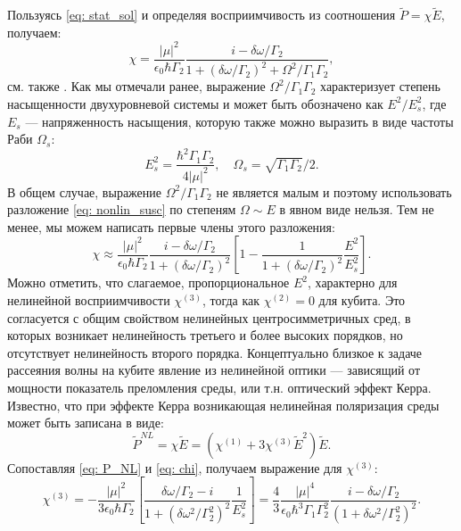 Пользуясь \eqref{eq: stat_sol} и определяя восприимчивость из соотношения $\tilde{P} = \chi\tilde{E}$, получаем:
\begin{equation}
\chi = \frac{|\mu|^2}{\epsilon_0\hbar\Gamma_2}\frac{i-\delta\omega/\Gamma_2}{1+(\delta\omega/\Gamma_2)^2 + \Omega^2/\Gamma_1\Gamma_2},
\end{equation}
см. также \cite{boyd2003nonlinear}. Как мы отмечали ранее, выражение $\Omega^2/\Gamma_1\Gamma_2$ характеризует степень насыщенности двухуровневой системы и может быть обозначено как ${E^2}/{E^2_s}$, где $E_s$ --- напряженность насыщения, которую также можно выразить в виде частоты Раби $\Omega_s$: 
\begin{equation}
E_s^2 = \frac{\hbar^2\Gamma_1\Gamma_2}{4|\mu|^2}, \quad \Omega_s = \sqrt{\Gamma_1\Gamma_2}/2.
\label{eq: E_s}
\end{equation}
В общем случае, выражение $\Omega^2/\Gamma_1\Gamma_2$ не является малым и поэтому использовать разложение \eqref{eq: nonlin_susc} по степеням $\Omega \sim E$ в явном виде нельзя. Тем не менее, мы можем написать первые члены этого разложения:  
\begin{equation}
\chi\approx\frac{|\mu|^2}{\epsilon_0\hbar\Gamma_2}\frac{i-\delta\omega/\Gamma_2}{1+(\delta\omega/\Gamma_2)^2}\left[1-\frac{1}{1+(\delta\omega/\Gamma_2)^2}\frac{E^2}{E^2_s}\right].
\label{eq: chi}
\end{equation}
Можно отметить, что слагаемое, пропорциональное $E^2$, характерно для нелинейной восприимчивости $\chi^{(3)}$, тогда как $\chi^{(2)}=0$ для кубита. Это согласуется с общим свойством нелинейных центросимметричных сред, в которых возникает нелинейность третьего и более высоких порядков, но отсутствует нелинейность второго порядка. 
Концептуально близкое к задаче рассеяния волны на кубите явление из нелинейной оптики --- зависящий от мощности показатель преломления среды, или т.н. оптический эффект Керра. Известно, что при эффекте Керра возникающая нелинейная поляризация среды может быть записана в виде:
\begin{equation}
\tilde{P}^{N\!L} = \chi \tilde{E} = \left(\chi^{(1)} + 3\chi^{(3)}\tilde{E}^2\right)\tilde{E}.
\label{eq: P_NL}
\end{equation}
Сопоставляя \eqref{eq: P_NL} и \eqref{eq: chi}, получаем выражение для $\chi^{(3)}$:
\begin{equation}
\chi^{(3)} = -\frac{|\mu|^2}{3\epsilon_0\hbar\Gamma_2}\left[\frac{\delta\omega/\Gamma_2-i}{1+(\delta\omega^2/\Gamma^2_2)^2}\frac{1}{E^2_s}\right] = \frac{4}{3}\frac{|\mu|^4}{\epsilon_0\hbar^3\Gamma_1\Gamma_2^2}\frac{i-\delta\omega/\Gamma_2}{(1+\delta\omega^2/\Gamma_2^2)^2}.
\label{eq: chi_3}
\end{equation}
